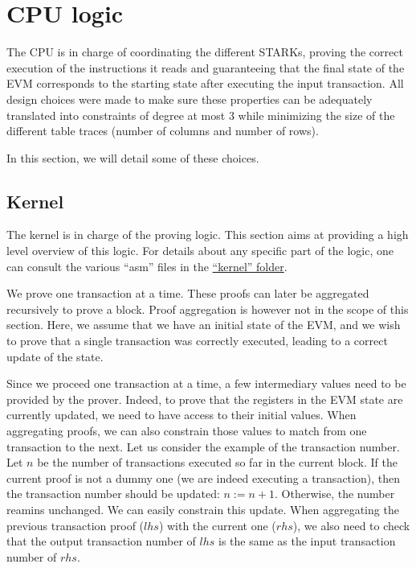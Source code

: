 \section{CPU logic}
\label{cpulogic}

The CPU is in charge of coordinating the different STARKs, proving the correct execution of the instructions it reads and guaranteeing
that the final state of the EVM corresponds to the starting state after executing the input transaction. All design choices were made 
to make sure these properties can be adequately translated into constraints of degree at most 3 while minimizing the size of the different
table traces (number of columns and number of rows).

In this section, we will detail some of these choices.

\subsection{Kernel}
The kernel is in charge of the proving logic. This section aims at providing a high level overview of this logic. For details about any specific part of the logic, one can consult the various ``asm'' files in the \href{https://github.com/0xPolygonZero/plonky2/tree/main/evm/src/cpu/kernel}{``kernel'' folder}.

We prove one transaction at a time. These proofs can later be aggregated recursively to prove a block. Proof aggregation is however not in the scope of this section. Here, we assume that we have an initial state of the EVM, and we wish to prove that a single transaction was correctly executed, leading to a correct update of the state.

Since we proceed one transaction at a time, a few intermediary values need to be provided by the prover. Indeed, to prove that the registers in the EVM state are currently updated, we need to have access to their initial values. When aggregating proofs, we can also constrain those values to match from one transaction to the next. Let us consider the example of the transaction number. Let $n$ be the number of transactions executed so far in the current block. If the current proof is not a dummy one (we are indeed executing a transaction), then the transaction number should be updated: $n := n+1$. Otherwise, the number reamins unchanged. We can easily constrain this update. When aggregating the previous transaction proof ($lhs$) with the current one ($rhs$), we also need to check that the output transaction number of $lhs$ is the same as the input transaction number of $rhs$. 

